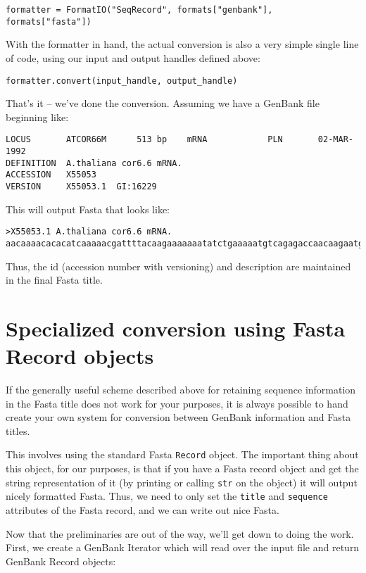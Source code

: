 \documentclass{article}
\begin{document}
\begin{verbatim}
formatter = FormatIO("SeqRecord", formats["genbank"], formats["fasta"])
\end{verbatim}

With the formatter in hand, the actual conversion is also a very simple
single line of code, using our input and output handles defined above:

\begin{verbatim}
formatter.convert(input_handle, output_handle)
\end{verbatim}

That's it -- we've done the conversion. Assuming we have a GenBank file
beginning like:

\begin{verbatim}
LOCUS       ATCOR66M      513 bp    mRNA            PLN       02-MAR-1992
DEFINITION  A.thaliana cor6.6 mRNA.
ACCESSION   X55053
VERSION     X55053.1  GI:16229
\end{verbatim}

This will output Fasta that looks like:

\begin{verbatim}
>X55053.1 A.thaliana cor6.6 mRNA.
aacaaaacacacatcaaaaacgattttacaagaaaaaaatatctgaaaaatgtcagagaccaacaagaatgc
\end{verbatim}

Thus, the id (accession number with versioning) and description are
maintained in the final Fasta title.

\section{Specialized conversion using Fasta Record objects}

If the generally useful scheme described above for retaining sequence 
information in the Fasta title does not work for your purposes, it is
always possible to hand create your own system for conversion between
GenBank information and Fasta titles.

This involves using the standard Fasta \verb|Record| object. The
important thing about this object, for our purposes, is that if you have
a Fasta record object and get the string representation of it (by
printing or calling \verb|str| on the object) it will output nicely
formatted Fasta. Thus, we need to only set the \verb|title| and
\verb|sequence| attributes of the Fasta record, and we can write out
nice Fasta.

Now that the preliminaries are out of the way, we'll get down to doing
the work. First, we create a GenBank Iterator which will read over the
input file and return GenBank Record objects:
\end{document}
